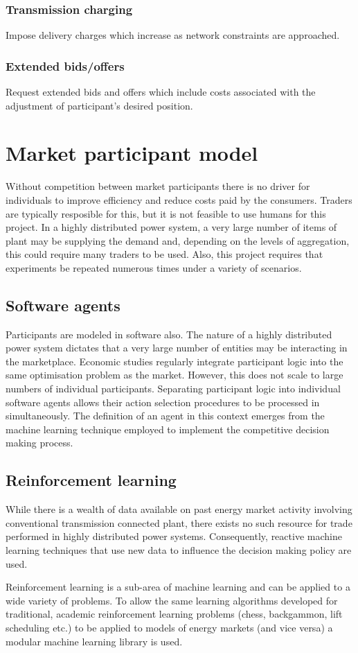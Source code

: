 \subsubsection{Transmission charging}
Impose delivery charges which increase as network constraints are approached.


\subsubsection{Extended bids/offers}
Request extended bids and offers which include costs associated with the
adjustment of participant's desired position.


\section{Market participant model}
Without competition between market participants there is no driver for
individuals to improve efficiency and reduce costs paid by the consumers.
Traders are typically resposible for this, but it is not feasible to use
humans for this project.  In a highly distributed power system, a very large
number of items of plant may be supplying the demand and, depending on the
levels of aggregation, this could require many traders to be used.  Also, this
project requires that experiments be repeated numerous times under a variety
of scenarios.

\subsection{Software agents}
Participants are modeled in software also.  The nature of a highly distributed
power system dictates that a very large number of entities may be interacting
in the marketplace.  Economic studies regularly integrate participant logic
into the same optimisation problem as the market.  However, this does not
scale to large numbers of individual participants.  Separating participant
logic into individual software agents allows their action selection procedures
to be processed in simultaneously.  The definition of an agent in this context
emerges from the machine learning technique employed to implement the
competitive decision making process.

\subsection{Reinforcement learning}
While there is a wealth of data available on past energy market activity
involving conventional transmission connected plant, there exists no such
resource for trade performed in highly distributed power systems.
Consequently, reactive machine learning techniques that use new data to
influence the decision making policy are used.

Reinforcement learning is a sub-area of machine learning and can be applied to
a wide variety of problems\cite{suttonbarto:reinforcement}.  To allow the same
learning algorithms developed for traditional, academic reinforcement learning
problems (chess, backgammon, lift scheduling etc.) to be applied to models of
energy markets (and vice versa) a modular machine learning library is used.
